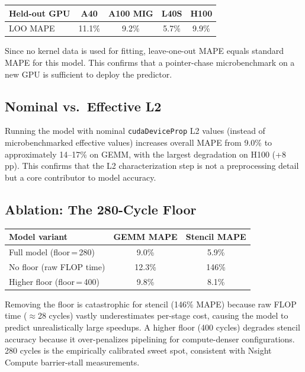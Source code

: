 \documentclass[sigplan,nonacm,10pt]{acmart}
\begin{document}
\begin{center}
\small
\renewcommand{\arraystretch}{1.2}
\begin{tabular}{@{}lcccc@{}}
\toprule
Held-out GPU & A40 & A100 MIG & L40S & H100 \\
\midrule
LOO MAPE & 11.1\% & 9.2\% & 5.7\% & 9.9\% \\
\bottomrule
\end{tabular}
\end{center}

Since no kernel data is used for fitting, leave-one-out MAPE equals
standard MAPE for this model.
This confirms that a pointer-chase microbenchmark on a new GPU is
sufficient to deploy the predictor.

\subsection{Nominal vs.\ Effective L2}

Running the model with nominal \texttt{cudaDeviceProp} L2 values
(instead of microbenchmarked effective values) increases overall MAPE
from 9.0\% to approximately 14--17\% on GEMM, with the largest
degradation on H100 (+8 pp).
This confirms that the L2 characterization step is not a preprocessing
detail but a core contributor to model accuracy.

\subsection{Ablation: The 280-Cycle Floor}

\begin{center}
\small
\renewcommand{\arraystretch}{1.2}
\begin{tabular}{@{}lcc@{}}
\toprule
Model variant & GEMM MAPE & Stencil MAPE \\
\midrule
Full model (floor\,=\,280)     & 9.0\%  & 5.9\% \\
No floor (raw FLOP time)       & 12.3\% & 146\% \\
Higher floor (floor\,=\,400)   & 9.8\%  & 8.1\% \\
\bottomrule
\end{tabular}
\end{center}

Removing the floor is catastrophic for stencil (146\% MAPE) because raw
FLOP time ($\approx$28 cycles) vastly underestimates per-stage cost,
causing the model to predict unrealistically large speedups.
A higher floor (400 cycles) degrades stencil accuracy because it
over-penalizes pipelining for compute-denser configurations.
280 cycles is the empirically calibrated sweet spot, consistent with
Nsight Compute barrier-stall measurements.
\end{document}
